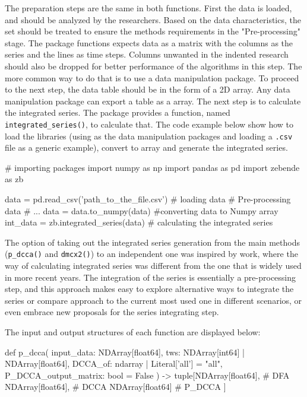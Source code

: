 \documentclass[article]{jss}
\begin{document}
The preparation steps are the same in both functions. First the data is loaded, and should be analyzed by the researchers. Based on the data characteristics, the set should be treated to ensure the methods requirements in the "Pre-processing" stage. The package functions expects data as a matrix with the columns as the series and the lines as time steps. Columns unwanted in the indented research should also be dropped for better performance of the algorithms in this step. The more common way to do that is to use a data manipulation package. To proceed to the next step, the data table should be in the form of a  2D array. Any data manipulation  package can export a table as a  array. The next step is to calculate the integrated series. The package provides a function, named \verb"integrated_series()", to calculate that. The code example below show how to load the libraries (using  as the data manipulation packages and loading a \verb".csv" file as a generic example), convert to  array and generate the integrated series.

\begin{Code}
# importing packages
import numpy as np
import pandas as pd
import zebende as zb

data = pd.read_csv('path_to_the_file.csv') # loading data
# Pre-processing data
# ...
data = data.to_numpy(data) #converting data to Numpy array
int_data = zb.integrated_series(data) # calculating the integrated series
\end{Code}

The option of taking out the integrated series generation from the main methods (\verb"p_dcca()" and \verb"dmcx2()") to an independent one was inspired by \cite{Peng_1994} work, where the way of calculating integrated series was different from the one that is widely used in more recent years. The integration of the series is essentially a pre-processing step, and this approach makes easy to explore alternative ways to integrate the series or compare \cite{Peng_1994} approach to the current most used one in different scenarios, or even embrace new proposals for the series integrating step.

The input and output structures of each function are displayed below:

\begin{Code}
def p_dcca(
    input_data: NDArray[float64],
    tws: NDArray[int64] | NDArray[float64],
    DCCA_of: ndarray | Literal['all'] = "all",
    P_DCCA_output_matrix: bool = False
) -> tuple[NDArray[float64],  # DFA
          NDArray[float64],   # DCCA
          NDArray[float64]    # P_DCCA
          ]
\end{Code}
\end{document}
